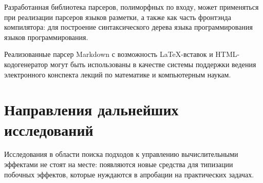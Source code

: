   Разработанная библиотека парсеров, полиморфных по входу, может применяться 
  при реализации парсеров языков разметки, а также как часть фронтэнда компилятора: 
  для построение синтаксического дерева языка программирования языков программирования. 

  Реализованные парсер Markdown с возможность \LaTeX-вставок и HTML-кодогенератор 
  могут быть использованы в качестве системы поддержки ведения электронного конспекта
  лекций по математике и компьютерным наукам. 

\section{Направления дальнейших исследований}

  Исследования в области поиска подходов к управлению вычислительными эффектами 
  не стоят на месте: появляются новые средства для типизации побочных эффектов, 
  которые нуждаются в апробации на практических задачах. 
